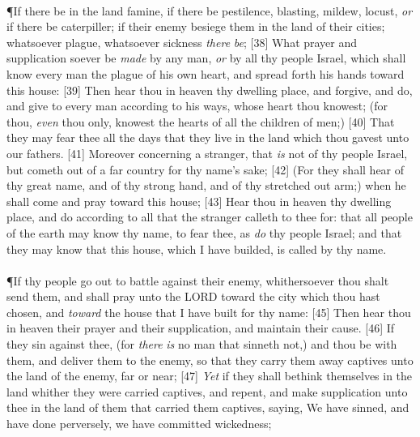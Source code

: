 \\
\P \textcolor[cmyk]{0.99998,1,0,0}{If there be in the land famine, if there be pestilence, blasting, mildew, locust, \emph{or} if there be caterpiller; if their enemy besiege them in the land of their cities; whatsoever plague, whatsoever sickness \emph{there} \emph{be};}
[38] \textcolor[cmyk]{0.99998,1,0,0}{What prayer and supplication soever be \emph{made} by any man, \emph{or} by all thy people Israel, which shall know every man the plague of his own heart, and spread forth his hands toward this house:}
[39] \textcolor[cmyk]{0.99998,1,0,0}{Then hear thou in heaven thy dwelling place, and forgive, and do, and give to every man according to his ways, whose heart thou knowest; (for thou, \emph{even} thou only, knowest the hearts of all the children of men;)}
[40] \textcolor[cmyk]{0.99998,1,0,0}{That they may fear thee all the days that they live in the land which thou gavest unto our fathers.}
[41] \textcolor[cmyk]{0.99998,1,0,0}{Moreover concerning a stranger, that \emph{is} not of thy people Israel, but cometh out of a far country for thy name's sake;}
[42] \textcolor[cmyk]{0.99998,1,0,0}{(For they shall hear of thy great name, and of thy strong hand, and of thy stretched out arm;) when he shall come and pray toward this house;}
[43] \textcolor[cmyk]{0.99998,1,0,0}{Hear thou in heaven thy dwelling place, and do according to all that the stranger calleth to thee for: that all people of the earth may know thy name, to fear thee, as \emph{do} thy people Israel; and that they may know that this house, which I have builded, is called by thy name.}\\
\\
\P \textcolor[cmyk]{0.99998,1,0,0}{If thy people go out to battle against their enemy, whithersoever thou shalt send them, and shall pray unto the LORD toward the city which thou hast chosen, and \emph{toward} the house that I have built for thy name:}
[45] \textcolor[cmyk]{0.99998,1,0,0}{Then hear thou in heaven their prayer and their supplication, and maintain their cause.}
[46] \textcolor[cmyk]{0.99998,1,0,0}{If they sin against thee, (for \emph{there} \emph{is} no man that sinneth not,) and thou be  with them, and deliver them to the enemy, so that they carry them away captives unto the land of the enemy, far or near;}
[47] \textcolor[cmyk]{0.99998,1,0,0}{\emph{Yet} if they shall bethink themselves in the land whither they were carried captives, and repent, and make supplication unto thee in the land of them that carried them captives, saying, We have sinned, and have done perversely, we have committed wickedness;}

